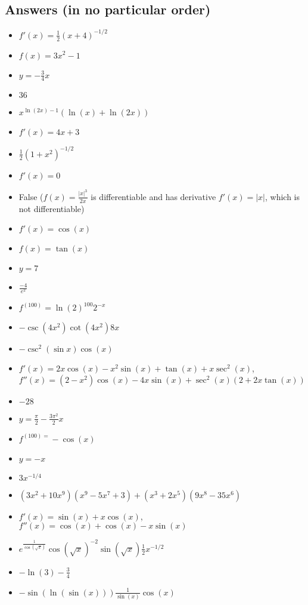 \documentclass{article}
\begin{document}
\newpage



\subsection*{Answers (in no particular order)}

\begin{itemize}
\item $f'(x)=\frac{1}{2}(x+4)^{-1/2}$
\item $f(x)=3x^2-1$
\item $y=-\frac{3}{4}x$
\item $36$
\item $x^{\ln(2x)-1}(\ln(x)+\ln(2x))$
\item $f'(x)=4x + 3$
\item $\frac{1}{2}(1+x^2)^{-1/2}$
\item $f'(x)=0$
\item False ($f(x)=\frac{\left|x\right|^{3}}{2x}$ is differentiable and has derivative $f'(x)=|x|$, which is not differentiable)
\item $f'(x)=\cos(x)$
\item $f(x)=\tan(x)$
\item $y=7$
\item $\frac{-4}{e^2}$
\item $f^{(100)}=\ln(2)^{100}2^{-x}$
\item $-\csc(4x^2)\cot(4x^2)8x$
\item $-\csc^2(\sin x) \cos(x)$
\item $f'(x)=2x\cos(x)-x^2\sin(x)+\tan(x)+x\sec^2(x)$, \\
$f''(x)=\left(2-x^{2}\right)\cos\left(x\right)-4x\sin\left(x\right)+\sec^{2}\left(x\right)\left(2+2x\tan\left(x\right)\right)$
\item $-28$
\item $y=\frac{\pi}{2}-\frac{3\pi^2}{2}x$
\item $f^{(100)=}-\cos(x)$
\item $y=-x$
\item $3x^{-1/4}$
\item $(3x^2+10x^9)(x^9-5x^7+3)+(x^3+2x^5)(9x^8-35x^6)$
\item $f'(x)=\sin(x) + x\cos(x)$, $f''(x)=\cos(x) + \cos(x) -x\sin(x)$
\item $e^{\frac{1}{\cos(\sqrt{x})}}\cos(\sqrt{x})^{-2}\sin(\sqrt{x})\frac{1}{2}x^{-1/2}$
\item $-\ln(3)-\frac34$
\item $-\sin(\ln(\sin(x)))\frac{1}{\sin(x)}\cos(x)$

\end{itemize}
\end{document}
